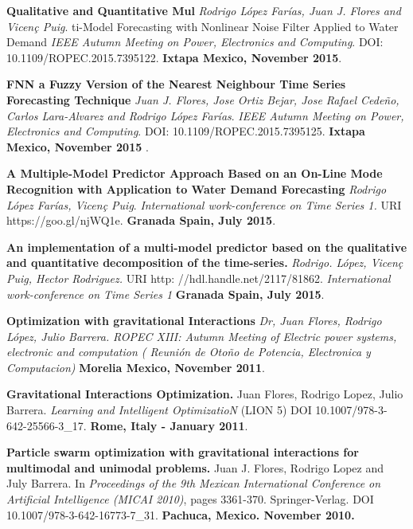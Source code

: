\documentclass[10pt]{article}
\newenvironment{innerlist}[1][\enskip\textbullet]%
        {\begin{compactitem}[#1]}{\end{compactitem}}
\begin{document}
\begin{innerlist}
\item \textbf{Qualitative and Quantitative Mul} \textit{Rodrigo López Farías, Juan J. Flores and Vicen\c{c} Puig}.  ti-Model Forecasting with Nonlinear Noise Filter Applied to Water Demand \textit{IEEE Autumn Meeting on Power, Electronics and Computing}. DOI: 10.1109/ROPEC.2015.7395122.  \textbf{Ixtapa Mexico, November 2015}.

\item \textbf{FNN a Fuzzy Version of the Nearest Neighbour Time Series Forecasting Technique } \textit{Juan J. Flores, Jose Ortiz Bejar, Jose Rafael Cedeño, Carlos Lara-Alvarez and Rodrigo López Farías}. \textit{IEEE Autumn Meeting on Power, Electronics and Computing}. DOI: 10.1109/ROPEC.2015.7395125. \textbf{Ixtapa Mexico, November 2015 }.

\item \textbf{A Multiple-Model Predictor Approach Based on an On-Line Mode Recognition with Application to Water Demand Forecasting} \textit{Rodrigo López Farías, Vicen\c{c} Puig}.  \textit{International work-conference on Time Series 1. 
} URI https://goo.gl/njWQ1e. \textbf{Granada Spain, July 2015}.

\item \textbf{An implementation of a multi-model predictor based on the qualitative and quantitative decomposition of the time-series.} \textit{Rodrigo. López, Vicen\c{c} Puig, Hector Rodriguez.} URI http: //hdl.handle.net/2117/81862. \textit{International work-conference on Time Series 1 
} \textbf{Granada Spain, July 2015}.

\item \textbf{Optimization with gravitational Interactions} \textit{Dr, Juan Flores, Rodrigo López, Julio Barrera.}   \textit{ROPEC XIII: Autumn Meeting of Electric power systems, electronic and computation ( Reunión de Oto\~no de Potencia, Electronica y Computacion)} \textbf{ Morelia Mexico, November 2011}.

\item \textbf{Gravitational Interactions Optimization.} Juan Flores, Rodrigo Lopez, Julio Barrera.  \textit{Learning and Intelligent OptimizatioN}  (LION 5) DOI 10.1007/978-3-642-25566-3\_17. \textbf{Rome, Italy - January 2011}. 

\item \textbf{Particle swarm optimization with gravitational interactions for multimodal and unimodal problems.} Juan J. Flores, Rodrigo Lopez and July Barrera.  In \textit{Proceedings of the 9th Mexican International Conference on Artificial Intelligence (MICAI 2010)}, pages 3361-370. Springer-Verlag. DOI 10.1007/978-3-642-16773-7\_31. \textbf{Pachuca, Mexico. November 2010.}

\end{innerlist}
\end{document}
